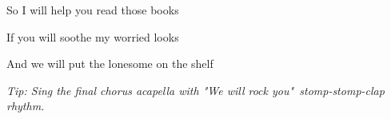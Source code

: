 \begin{song}
\bigskip

So I will help you read those books \par
If you will soothe my worried looks \par
And we will put the lonesome on the shelf \par

\bigskip

\Chorus {}

\bigskip
\bigskip
\bigskip

\textit{\smaller
Tip: Sing the final chorus acapella with "We will rock you"\ stomp-stomp-clap rhythm.
}

\end{song}
